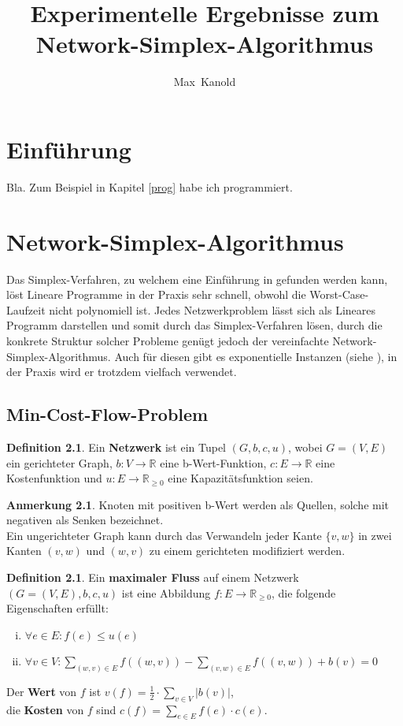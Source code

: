 \documentclass[a4paper,twoside]{report}
\author{Max~Kanold}
\title{Experimentelle Ergebnisse zum Network-Simplex-Algorithmus}
\theoremstyle{plain}
\theoremstyle{definition}
\newtheorem{defn}[thm]{Definition}
\newtheorem*{anm}{Anmerkung}
\begin{document}
\maketitle
\tableofcontents

\newpage
\chapter{Einführung}
Bla. Zum Beispiel in Kapitel \ref{prog} habe ich programmiert.

\newpage
\chapter{Network-Simplex-Algorithmus}
Das Simplex-Verfahren, zu welchem eine Einführung in \cite{NSAbook} gefunden werden kann, löst Lineare Programme in der Praxis sehr schnell, obwohl die Worst-Case-Laufzeit nicht polynomiell ist. Jedes Netzwerkproblem lässt sich als Lineares Programm darstellen und somit durch das Simplex-Verfahren lösen, durch die konkrete Struktur solcher Probleme genügt jedoch der vereinfachte Network-Simplex-Algorithmus. Auch für diesen gibt es exponentielle Instanzen (siehe \cite{Exponential}), in der Praxis wird er trotzdem vielfach verwendet.

\section{Min-Cost-Flow-Problem}
\begin{defn}Ein \textbf{Netzwerk} ist ein Tupel $(G,b,c,u)$, wobei $G = (V,E)$ ein gerichteter Graph, $b : V\rightarrow\mathbb{R}$ eine b-Wert-Funktion, $c : E\rightarrow\mathbb{R}$ eine Kostenfunktion und $u : E\rightarrow\mathbb{R}_{\geq 0}$ eine Kapazitätsfunktion seien.\end{defn}
\begin{anm}Knoten mit positiven b-Wert werden als Quellen, solche mit negativen als Senken bezeichnet.\\
Ein ungerichteter Graph kann durch das Verwandeln jeder Kante $\{v,w\}$ in zwei Kanten $(v,w)$ und $(w,v)$ zu einem gerichteten modifiziert werden.\end{anm}

\begin{defn}Ein \textbf{maximaler Fluss} auf einem Netzwerk $(G=(V,E),b,c,u)$ ist eine Abbildung $f : E\rightarrow\mathbb{R}_{\geq 0}$, die folgende Eigenschaften erfüllt:
\begin{enumerate}[(i)]
\item $\forall e\in E : f(e)\leq u(e) $
\item $\forall v\in V : \sum_{(w,v)\in E} f((w,v)) - \sum_{(v,w)\in E} f((v,w)) + b(v) = 0$
\end{enumerate}
Der \textbf{Wert} von $f$ ist
$v(f) = \frac{1}{2}\cdot\sum_{v\in V} |b(v)|$,\\
die \textbf{Kosten} von $f$ sind
$c(f) = \sum_{e\in E} f(e)\cdot c(e)$.
\end{defn}
\end{document}
